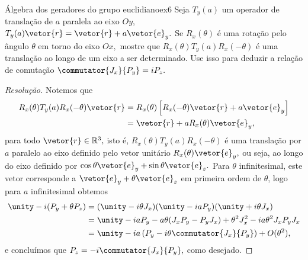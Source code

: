 \begin{exercício}{Álgebra dos geradores do grupo euclidiano}{ex6}
   Seja \(T_y(a)\) um operador de translação de \(a\) paralela ao eixo \(Oy\), \(T_y(a) \vetor{r} = \vetor{r} + a \vetor{e}_y.\) Se \(R_x(\theta)\) é uma rotação pelo ângulo \(\theta\) em torno do eixo \(Ox,\) mostre que \(R_x(\theta) T_y(a) R_x(-\theta)\) é uma translação ao longo de um eixo a ser determinado. Use isso para deduzir a relação de comutação \(\commutator{J_x}{P_y} = i P_z.\)
\end{exercício}
\begin{proof}[Resolução]
    Notemos que
    \begin{align*}
       R_x(\theta) T_y(a) R_x(-\theta) \vetor{r} &= R_x(\theta) \left[ R_x(-\theta) \vetor{r} + a \vetor{e}_y\right]\\
                                                 &= \vetor{r} + a R_x(\theta)\vetor{e}_y,
    \end{align*}
    para todo \(\vetor{r} \in \mathbb{R}^3,\) isto é, \(R_x(\theta) T_y(a) R_x(-\theta)\) é uma translação por \(a\) paralelo ao eixo definido pelo vetor unitário \(R_x(\theta)\vetor{e}_y,\) ou seja, ao longo do eixo definido por \(\cos\theta \vetor{e}_y + \sin\theta\vetor{e}_z.\) Para \(\theta\) infinitesimal, este vetor corresponde a \(\vetor{e}_y + \theta \vetor{e}_z\) em primeira ordem de \(\theta\), logo para \(a\) infinitesimal obtemos
    \begin{align*}
       \unity - i (P_y  + \theta P_z) &= (\unity - i \theta J_x) (\unity - i a P_y) (\unity + i \theta J_x)\\
                                      &= \unity - i a P_y - a \theta (J_x P_y - P_y J_x) + \theta^2 J_x^2 - i a \theta^2 J_x P_y J_x\\
                                      &= \unity - ia \left(P_y - i\theta \commutator{J_x}{P_y}\right) + O(\theta^2),
    \end{align*}
    e concluímos que \(P_z = -i\commutator{J_x}{P_y},\) como desejado.
\end{proof}

